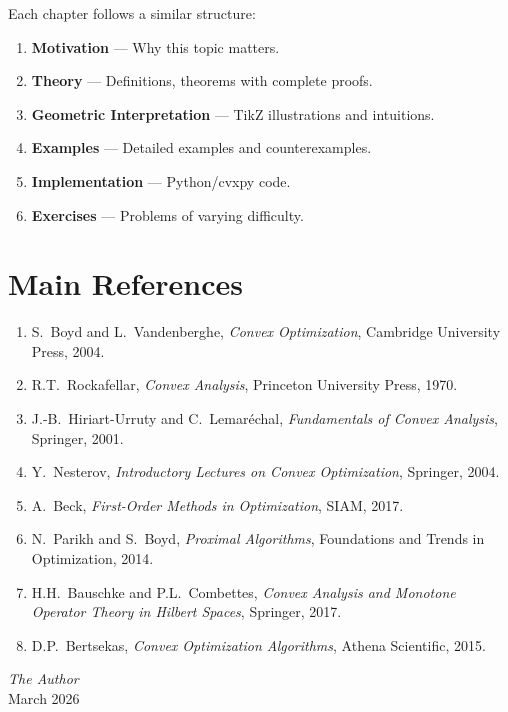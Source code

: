 Each chapter follows a similar structure:
\begin{enumerate}
    \item \textbf{Motivation} --- Why this topic matters.
    \item \textbf{Theory} --- Definitions, theorems with complete proofs.
    \item \textbf{Geometric Interpretation} --- TikZ illustrations and intuitions.
    \item \textbf{Examples} --- Detailed examples and counterexamples.
    \item \textbf{Implementation} --- Python/cvxpy code.
    \item \textbf{Exercises} --- Problems of varying difficulty.
\end{enumerate}

\section*{Main References}

\begin{enumerate}
    \item S.~Boyd and L.~Vandenberghe, \emph{Convex Optimization},
          Cambridge University Press, 2004.
    \item R.T.~Rockafellar, \emph{Convex Analysis},
          Princeton University Press, 1970.
    \item J.-B.~Hiriart-Urruty and C.~Lemar\'echal,
          \emph{Fundamentals of Convex Analysis}, Springer, 2001.
    \item Y.~Nesterov, \emph{Introductory Lectures on Convex Optimization},
          Springer, 2004.
    \item A.~Beck, \emph{First-Order Methods in Optimization}, SIAM, 2017.
    \item N.~Parikh and S.~Boyd, \emph{Proximal Algorithms},
          Foundations and Trends in Optimization, 2014.
    \item H.H.~Bauschke and P.L.~Combettes,
          \emph{Convex Analysis and Monotone Operator Theory in Hilbert Spaces},
          Springer, 2017.
    \item D.P.~Bertsekas, \emph{Convex Optimization Algorithms}, Athena Scientific, 2015.
\end{enumerate}

\vfill

\begin{flushright}
\textit{The Author}\\
March 2026
\end{flushright}
